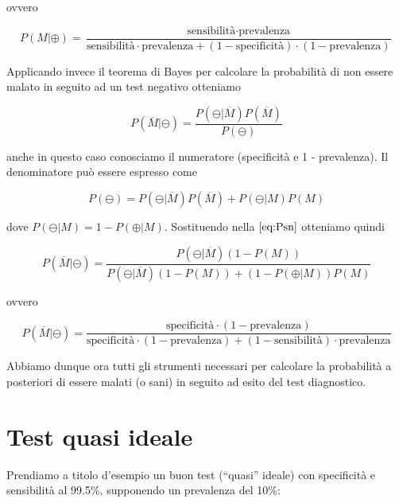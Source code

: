 \documentclass[11pt]{article}
\begin{document}
ovvero

\begin{equation}\label{eq:Pmp3}
P(M|\oplus) = \frac{
\textrm{sensibilità} \cdot \textrm{prevalenza} }{
\textrm{sensibilità} \cdot \textrm{prevalenza} + (1 - \textrm{specificità}) \cdot (1 - \textrm{prevalenza})
}
\end{equation}

Applicando invece il teorema di Bayes per calcolare la probabilità di
non essere malato in seguito ad un test negativo otteniamo

\begin{equation}\label{eq:Psn}
P(\overline{M}|\ominus) = \frac{P(\ominus|\overline{M})P(\overline{M})}{P(\ominus)}
\end{equation}

anche in questo caso conosciamo il numeratore (specificità e 1 -
prevalenza). Il denominatore può essere espresso come

\begin{equation}\label{eq:Pn}
P(\ominus) = P(\ominus|\overline{M})P(\overline{M}) + P(\ominus|M)P(M)
\end{equation}

dove \(P(\ominus|M) = 1 - P(\oplus|M)\). Sostituendo nella
\(\eqref{eq:Psn}\) otteniamo quindi

\begin{equation}\label{eq:Psn2}
P(\overline{M}|\ominus) = \frac{
P(\ominus|\overline{M})(1 - P(M))
}{
P(\ominus|\overline{M})(1 - P(M)) + (1 - P(\oplus|M))P(M)
}
\end{equation}

ovvero

\begin{equation}\label{eq:Psn3}
P(\overline{M}|\ominus) = \frac{
\textrm{specificità} \cdot (1 - \textrm{prevalenza})
}{
\textrm{specificità} \cdot (1 - \textrm{prevalenza}) + 
(1 - \textrm{sensibilità}) \cdot \textrm{prevalenza}
}
\end{equation}

Abbiamo dunque ora tutti gli strumenti necessari per calcolare la
probabilità a posteriori di essere malati (o sani) in seguito ad esito
del test diagnostico.

\hypertarget{test-quasi-ideale}{%
\section{Test quasi ideale}\label{test-quasi-ideale}}

Prendiamo a titolo d'esempio un buon test (``quasi'' ideale) con
specificità e sensibilità al 99.5\%, supponendo un prevalenza del 10\%:
\end{document}

